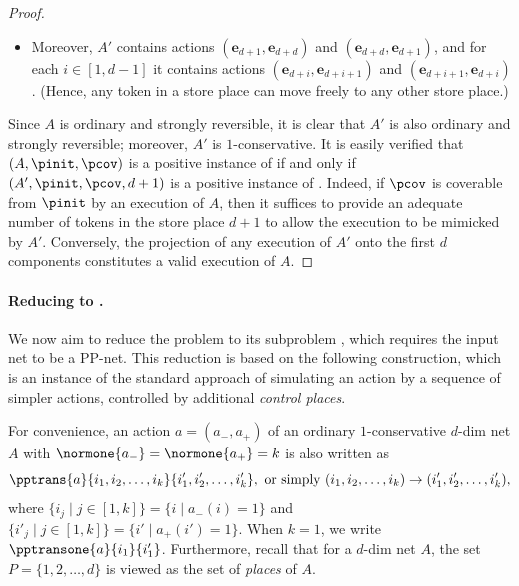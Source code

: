 \begin{proof}
\begin{itemize}
	\item
Moreover, $A'$ contains actions $(\mathbf{e}_{d+1},\mathbf{e}_{d+d})$ and 
		$(\mathbf{e}_{d+d},\mathbf{e}_{d+1})$, and   
		for each $i\in[1,d-1]$ it contains actions
		$(\mathbf{e}_{d+i},\mathbf{e}_{d+i+1})$ and 
		$(\mathbf{e}_{d+i+1},\mathbf{e}_{d+i})$. 
		(Hence, any token in a store place can move freely to any other store place.)
\end{itemize}
Since $A$ is ordinary and strongly reversible, it is
 clear that $A'$ is also ordinary and strongly reversible; moreover,
	$A'$ is $1$-conservative. 
	It is easily verified that $(A,\pinit,\pcov)$ is a positive instance of \Cover if and
	only if  $(A',\pinit,\pcov,d+1)$ is a positive instance of
	\SCover. 
Indeed, if $\pcov$ is coverable from $\pinit$ by an execution of $A$, then
it suffices to provide an adequate number of tokens in the store place
	$d+1$ to allow the execution to be mimicked by $A'$.
	Conversely, the projection of any execution of $A'$ onto the
	first $d$ components constitutes a valid execution of $A$.
\end{proof}	



\paragraph{Reducing \SCover to \PPSCover.}
We now aim to reduce the \SCover problem to its subproblem \PPSCover,
which requires the input net to be a PP-net.  
This reduction is based on the following construction, which is an instance of
the standard approach of simulating an action by a sequence of simpler
actions, controlled by additional \emph{control places}. 

For convenience, an action $a=(a_-,a_+)$ of an ordinary
$1$-conservative $d$-dim net $A$ with
$\normone{a_-}=\normone{a_+}=k$ is also written as 
\begin{equation*}
\pptrans{a}{i_1,i_2,\dots,i_k}{i'_1,i'_2,\dots,i'_k},
	\text{ or simply }(i_1,i_2,\dots,i_k)\rightarrow(i'_1,i'_2,\dots,i'_k),
\end{equation*}
where $\{i_j\mid j\in[1,k]\}=\{i\mid a_-(i)=1\}$ and
 $\{i'_j\mid j\in[1,k]\}=\{i'\mid a_+(i')=1\}$.
When $k=1$, we write $\pptransone{a}{i_1}{i'_1}$.
Furthermore, recall that for a $d$-dim net $A$, the set
$P=\{1,2,\dots,d\}$ is viewed as the set of \emph{places} of $A$.   




